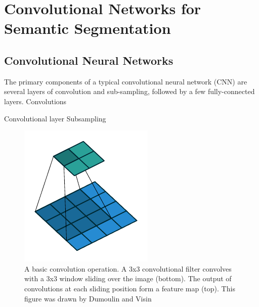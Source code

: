 \appendix



\section{Convolutional Networks for Semantic Segmentation}

\subsection{Convolutional Neural Networks}

The primary components of a typical convolutional neural network (CNN) are several layers of convolution and sub-sampling, followed by a few fully-connected layers.
Convolutions

Convolutional layer
Subsampling

\begin{figure}[t]
\centering
   \includegraphics[width=\linewidth]{img/no_padding_no_strides_00.pdf}
\caption{
A basic convolution operation.
A 3x3 convolutional filter convolves with a 3x3 window sliding over the image (bottom).
The output of convolutions at each sliding position form a feature map (top).
This figure was drawn by Dumoulin and Visin\cite{dumoulin2016guide}
}
\label{fig:lenet}
\end{figure}

